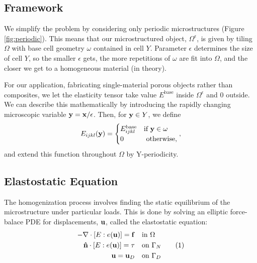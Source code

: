 \documentclass[10pt]{article}
\providecommand{\e}{\epsilon}
\newcommand\numberthis{\addtocounter{equation}{1}\tag{\theequation}}
\begin{document}
\subsection{Framework}
We simplify the problem by considering only periodic microstructures (Figure
\ref{fig:periodic}). This means that our microstructured object, $\Omega^\e$,
is given by tiling $\Omega$ with base cell geometry $\omega$ contained in cell $Y$.
Parameter $\epsilon$ determines the size of cell $Y$, so the smaller $\epsilon$
gets, the more repetitions of $\omega$ are fit into $\Omega$, and the closer we
get to a homogeneous material (in theory).

For our application, fabricating single-material porous objects rather
than composites, we let the elasticity tensor take value $E^\text{base}$ inside
$\Omega^\e$ and $0$ outside. We can describe this mathematically by introducing
the rapidly changing microscopic variable ${\bf y} = {\bf x} / \epsilon$. Then,
for ${\bf y} \in Y$, we define
$$
E_{ijkl} ({\bf y}) = \begin{cases} E_{ijkl}^\text{base} & \text{if } {\bf y} \in \omega \\
                                 0 & \text{ otherwise,} \end{cases},
$$
and extend this function throughout $\Omega$ by Y-periodicity.

\subsection{Elastostatic Equation}
The homogenization process involves finding the static equilibrium of the
microstructure under particular loads. This is done by solving an
elliptic force-balace PDE for displacements, ${\bf u}$, called the elastostatic
equation:
\begin{align*}
    -\nabla \cdot [E : e({\bf u})] = {\bf f} \quad &\text{in } \Omega \\
    {\bf \hat{n}} \cdot [E : e({\bf u})] = {\bf \tau} \quad &\text{on } \Gamma_N \numberthis \label{eqn:elastostatic} \\
    {\bf u} = {\bf u}_D \quad &\text{on } \Gamma_D
\end{align*}
 
\end{document}
